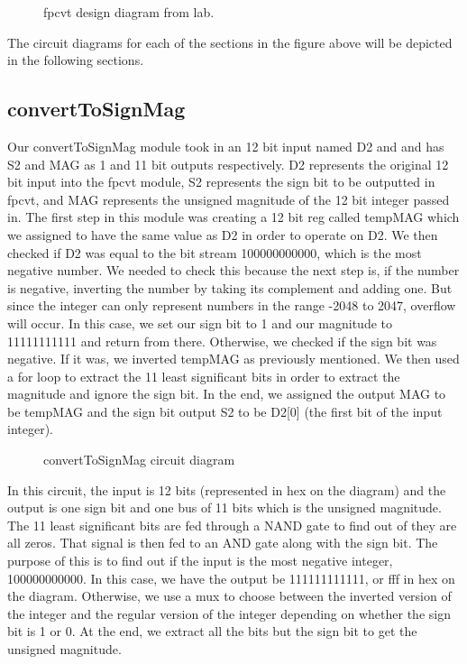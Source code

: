 \documentclass{article}
\begin{document}
\begin{figure}[H]
	\begin{center}
		\caption{fpcvt design diagram from lab.}
	\end{center}
\end{figure}

The circuit diagrams for each of the sections in the figure above will be depicted in the following sections.

\subsection*{convertToSignMag}
Our convertToSignMag module took in an 12 bit input named D2 and and has S2 and MAG as 1 and 11 bit outputs respectively. D2 represents the original 12 bit input into the fpcvt module, S2 represents the sign bit to be outputted in fpcvt, and MAG represents the unsigned magnitude of the 12 bit integer passed in. The first step in this module was creating a 12 bit reg called tempMAG which we assigned to have the same value as D2 in order to operate on D2. We then checked if D2 was equal to the bit stream 100000000000, which is the most negative number. We needed to check this because the next step is, if the number is negative, inverting the number by taking its complement and adding one. But since the integer can only represent numbers in the range -2048 to 2047, overflow will occur. In this case, we set our sign bit to 1 and our magnitude to 11111111111 and return from there. Otherwise, we checked if the sign bit was negative. If it was, we inverted tempMAG as previously mentioned. We then used a for loop to extract the 11 least significant bits in order to extract the magnitude and ignore the sign bit. In the end, we assigned the output MAG to be tempMAG and the sign bit output S2 to be D2[0] (the first bit of the input integer).

\begin{figure}[H]
	\begin{center}
		\caption{convertToSignMag circuit diagram}
	\end{center}
\end{figure}

In this circuit, the input is 12 bits (represented in hex on the diagram) and the output is one sign bit and one bus of 11 bits which is the unsigned magnitude. The 11 least significant bits are fed through a NAND gate to find out of they are all zeros. That signal is then fed to an AND gate along with the sign bit. The purpose of this is to find out if the input is the most negative integer, 100000000000. In this case, we have the output be 111111111111, or fff in hex on the diagram. Otherwise, we use a mux to choose between the inverted version of the integer and the regular version of the integer depending on whether the sign bit is 1 or 0. At the end, we extract all the bits but the sign bit to get the unsigned magnitude.
\end{document}
